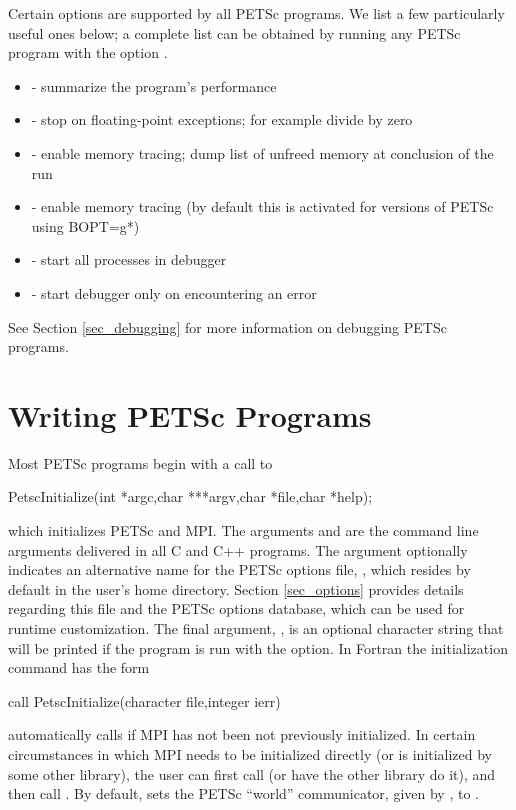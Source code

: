 Certain options are supported by all PETSc programs.  We list a few 
particularly useful ones below; a complete list can be obtained by 
running any PETSc program with the option .
\begin{itemize}
\item {} - summarize the program's performance
\item {} - stop on floating-point exceptions; 
      for example divide by zero
\item {} - enable memory tracing; dump list of unfreed memory 
      at conclusion  of the run
\item {} - enable memory tracing (by default this is 
      activated for versions of PETSc using BOPT=g*)
\item {}   
     - start all processes in debugger  
\item {}  
       - start debugger only on encountering an error
\end{itemize}
See Section \ref{sec_debugging} for more information on debugging PETSc programs.

\section{Writing PETSc Programs}
\label{sec_writing}

Most PETSc programs begin with a call to 
\begin{tabbing}
  PetscInitialize(int *argc,char ***argv,char *file,char *help);
\end{tabbing} 
which initializes PETSc and MPI.  The arguments  and 
 are the command line arguments delivered in all C and C++
programs.  The argument 
optionally indicates an alternative name for the PETSc options file,
, which resides by default in the user's home directory.
Section \ref{sec_options} provides details regarding
this file and the PETSc options database, which can be used for runtime
customization. The final argument, , is an optional
character string that will be printed if the program is run with the
 option.  In Fortran the initialization command has the form
\begin{tabbing}
   call PetscInitialize(character file,integer ierr)
\end{tabbing} 
 automatically calls  if MPI
has not been not previously initialized. In certain 
circumstances in which MPI needs to be initialized directly (or is
initialized by some other library), the user can first call 
 (or have the other library do it), and then call
.
By default,  sets the PETSc ``world''
communicator, given by , to .

